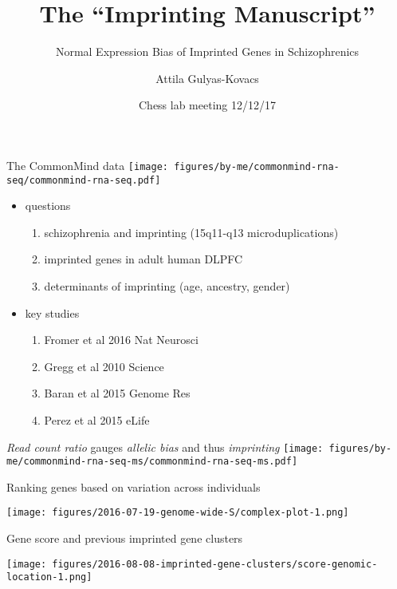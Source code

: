 \documentclass{beamer}
\title{The ``Imprinting Manuscript''}
\subtitle{Normal Expression Bias of Imprinted Genes in Schizophrenics}
\author{Attila Gulyas-Kovacs}
\date{Chess lab meeting 12/12/17}
\begin{document}
\maketitle

\begin{frame}[label=cmc]{The CommonMind data}
\texttt{[image: figures/by-me/commonmind-rna-seq/commonmind-rna-seq.pdf]}
\end{frame}

\begin{frame}
\begin{itemize}
\item questions
\begin{enumerate}
\item schizophrenia and imprinting (15q11-q13 microduplications)
\item imprinted genes in adult human DLPFC
\item determinants of imprinting (age, ancestry, gender)
\end{enumerate}
\item key studies
\begin{enumerate}
\item Fromer et al 2016 Nat Neurosci
\item Gregg et al 2010 Science
\item Baran et al 2015 Genome Res
\item Perez et al 2015 eLife 
\end{enumerate}
\end{itemize}
\end{frame}

\begin{frame}{\emph{Read count ratio} gauges \emph{allelic bias} and thus \emph{imprinting}}
\texttt{[image: figures/by-me/commonmind-rna-seq-ms/commonmind-rna-seq-ms.pdf]}
\end{frame}

\begin{frame}{Ranking genes based on variation across individuals}
\begin{center}
\texttt{[image: figures/2016-07-19-genome-wide-S/complex-plot-1.png]}
\end{center}
\end{frame}

\begin{frame}{Gene score and previous imprinted gene clusters}
\begin{center}
\texttt{[image: figures/2016-08-08-imprinted-gene-clusters/score-genomic-location-1.png]}
\end{center}
\end{frame}
\end{document}
